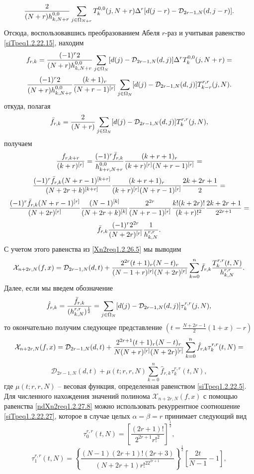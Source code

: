      $$
     {2\over (N+r)h_{k,N+r}^{0,0}}
     \sum_{j\in\Omega_{N+r}}T_k^{0,0}(j,N+r)\Delta^r[d(j-r)-\mathcal{D}_{2r-1,N}(d,j-r)].
    $$
 Отсюда, воспользовавшись преобразованием Абеля $r$-раз и учитывая равенство \eqref{siTpeq1.2.22.15}, находим
  $$
f_{r,k}={(-1)^r2\over (N+r)h_{k,N+r}^{0,0}}
     \sum_{j\in\Omega_N}[d(j)-\mathcal{D}_{2r-1,N}(d,j)]\Delta^rT_k^{0,0}(j,N+r)=
$$
$$
{(-1)^r2\over (N+r)h_{k,N+r}^{0,0}}{(k+1)_r\over (N+r-1)^{[r]}}
     \sum_{j\in\Omega_N}[d(j)-\mathcal{D}_{2r-1,N}(d,j)] T_{k-r}^{r,r}(j,N).
$$
откуда, полагая
$$
\bar f_{r,k}=
{2\over (N+r)}\sum_{j\in\Omega_N}[d(j)-\mathcal{D}_{2r-1,N}(d,j)] T_k^{r,r}(j,N),
$$
получаем
$$
{f_{r,k+r}\over (k+r)^{[r]}} ={(-1)^r\bar f_{r,k}\over h^{0,0}_{k+r,N+r}}{(k+r+1)_r\over (k+r)^{[r]} (N+r-1)^{[r]}}=
$$
$$
{(-1)^r\bar f_{r,k}(N+r-1)^{[k+r]}\over(N+2r+k)^{[k+r]}}{(k+r+1)_r\over (k+r)^{[r]} (N+r-1)^{[r]}}{2k+2r+1\over2}=
$$
$$
{(-1)^r\bar f_{r,k}(N+r-1)^{[r]}\over(N+2r)^{[r]}}{(N-1)^{[k]}\over(N+2r+k)^{[k]}}{2^{2r}\over(N+r-1)^{[r]}}
   {k!(k+2r)!\over (k+r)!^2}{2k+2r+1\over2^{2r+1}}=
$$
$$
\bar f_{r,k}{(-1)^r2^{2r}\over(N+2r)^{[r]}}{1\over h^{r,r}_{k,N}}.
$$
С учетом этого равенства из  \eqref{Xn2req1.2.26.5} мы выводим
$$
\mathcal{X}_{n+2r,N}(f,x)=\mathcal{D}_{2r-1,N}(d,t)+{2^{2r}(t+1)_r(N-t)_r\over (N-1+r)^{[r]}(N+2r)^{[r]}}
\sum_{k=0}^n \bar f_{r,k}{T_k^{r,r}(t,N)\over h^{r,r}_{k,N}}.
 $$
Далее, если мы введем обозначение
\begin{equation}\label{ndXn2req1.2.27.7}
\hat f_{r,k}={\bar f_{r,k}\over( h^{r,r}_{k,N})^\frac12}=\sum_{j\in\Omega_N}[d(j)-\mathcal{D}_{2r-1,N}(d,j)] \tau_k^{r,r}(j,N),
\end{equation}
то окончательно получим следующее представление $(t=\frac{N+2r-1}{2}(1+x)-r)$
$$
\mathcal{X}_{n+2r,N}(f,x)=\mathcal{D}_{2r-1,N}(d,t)+{2^{2r+1}(t+1)_r(N-t)_r\over N(N+r)^{[r]}(N+2r)^{[r]}}
\sum_{k=0}^n \hat f_{r,k}\tau_k^{r,r}(t,N)=
 $$
\begin{equation}\label{ndXn2req1.2.27.8}
\mathcal{D}_{2r-1,N}(d,t)+\mu(t;r,r,N)\sum_{k=0}^n \hat f_{r,k}\tau_k^{r,r}(t,N),
\end{equation}
где $\mu(t;r,r,N)$ -- весовая функция, определенная равенством \eqref{siTpeq1.2.22.5}. Для численного нахождения значений полинома $\mathcal{X}_{n+2r,N}(f,x)$ с помощью равенства \eqref{ndXn2req1.2.27.8} можно использовать рекуррентное соотношение
\eqref{siTpeq1.2.22.27}, которое в случае целых $\alpha=\beta=r$ принимает следующий вид
$$
\tau_0^{r,r}(t,N)=\left[\frac{(2r+1)!}{2^{2r+1}r!^2}\right]^\frac12,
$$
$$
\tau_1^{r,r}(t,N)=\left\{\frac{(N-1)(2r+1)!(2r+3)}{(N+2r+1)r!^22^{2r+1}}\right\}^\frac12\left[\frac{2t}{N-1}-1\right],
$$


